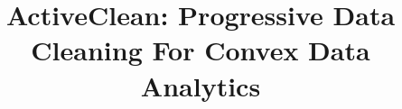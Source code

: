 \documentclass{sig-alternate}
\begin{document}
\newcommand{\reminder}[1]{{{\textcolor{magenta}{\{\{\bf #1\}\}}}\xspace}}
\newcommand{\specialcell}[2][c]{%
  \begin{tabular}[#1]{@{}c@{}}#2\end{tabular}}

\def\ojoin{\setbox0=\hbox{$\bowtie$}%
  \rule[-.02ex]{.25em}{.4pt}\llap{\rule[\ht0]{.25em}{.4pt}}}
\def\leftouterjoin{\mathbin{\ojoin\mkern-5.8mu\bowtie}}
\def\rightouterjoin{\mathbin{\bowtie\mkern-5.8mu\ojoin}}
\def\fullouterjoin{\mathbin{\ojoin\mkern-5.8mu\bowtie\mkern-5.8mu\ojoin}}


\pagestyle{plain}

\title{ActiveClean: Progressive Data Cleaning For Convex Data Analytics}





\maketitle
\end{document}
